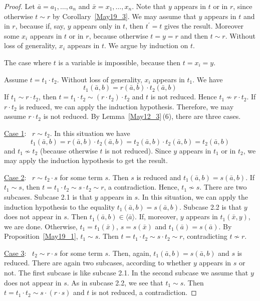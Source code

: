 \documentclass[a4paper, 11pt]{article}
\theoremstyle{note}
\begin{document}
	\begin{proof} Let $\bar{a}= a_1,\ldots,a_n$ and $\bar{x}= x_1,\ldots,x_n$. Note that $y$ appears in $t$ or in $r$, since otherwise  $t\sim r$  by Corollary~\ref{May19_3}.  We may assume that $y$ appears in $t$ and in $r$, because if, say, $y$ appears only in $t$, then $t^\prime= t$ gives the result. Moreover some $x_i$ appears in $t$  or in $r$, because otherwise $t=y=r$ and then $t\sim r$. Without loss of generality, $x_i$ appears in $t$. We argue by induction on $t$.
		
		The case where $t$ is a variable is impossible, because then $t=x_i =y $.
		
		Assume $t=t_1\cdot t_2$.  Without loss of generality, $x_i$ appears in $t_1$.  We have
		$$t_1(\bar{a},b)= r(\bar{a},b)\cdot t_2(\bar{a},b)$$
		If $t_1\sim r\cdot t_2$, then $t= t_1\cdot t_2\sim (r\cdot t_2)\cdot t_2$ and $t$ is not reduced. Hence $t_1\not\sim r\cdot t_2$. If $r\cdot t_2$ is reduced, we can apply the induction hypothesis. Therefore, we may assume $r\cdot t_2$ is not reduced. By Lemma~\ref{May12_3}\,(6), there are three cases.
		
		\underline{Case 1}: \ $r\sim t_2$.  In this situation we have
		$$t_1(\bar{a},b)= r(\bar{a},b)\cdot t_2(\bar{a},b)= t_2(\bar{a},b)\cdot t_2(\bar{a},b) =t_2(\bar{a},b)$$
		and $t_1\not\sim t_2$ (because otherwise $t$ is not reduced). Since $y$ appears in $t_1$ or in $t_2$, we may apply the induction hypothesis to get the result.
		
		\underline{Case 2}: \  $r\sim t_2\cdot s$  for some term $s$. Then $s$ is reduced and $t_1(\bar{a},b)= s(\bar{a},b)$. If $t_1\sim s$, then $t=t_1\cdot t_2 \sim s\cdot t_2 \sim r$, a contradiction. Hence, $t_1\not\sim s$. There are two subcases. Subcase 2.1 is that $y$ appears in $s$. In this situation, we can apply the induction hypothesis to the equality $t_1(\bar{a},b)= s(\bar{a},b)$.  Subcase 2.2 is that $y$  does not appear in $s$. Then  $t_1(\bar{a},b)\in\langle\bar{a}\rangle$. If, moreover, $y$ appears in $t_1(\bar{x},y)$, we are done. Otherwise, $t_1= t_1(\bar{x})$, $s = s(\bar{x})$ and  $t_1(\bar{a})= s(\bar{a})$. By Proposition~\ref{May19_1}, $t_1\sim s$. Then  $t= t_1\cdot t_2\sim s\cdot t_2\sim r$, contradicting $t\not\sim r$.
		
		\underline{Case 3}: \ $t_2\sim r\cdot s$ for some term $s$. Then, again, $t_1(\bar{a},b)= s(\bar{a},b)$ and $s$ is reduced. There are again two subcases, according to whether $y$ appears in $s$ or not. The first subcase is like subcase 2.1. In the second subcase we assume that $y$ does not appear in $s$. As in subcase 2.2, we see that $t_1\sim s$. Then $t= t_1\cdot t_2 \sim s\cdot (r\cdot s)$ and $t$ is not reduced, a contradiction.
	\end{proof}
	
\end{document}
